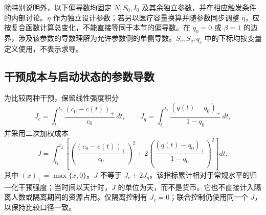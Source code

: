\documentclass[lang=cn,a4paper,newtx]{elegantpaper}
\numberwithin{equation}{section}
\theoremstyle{plain}
\begin{document}
除特别说明外，以下偏导数均固定 $N,S_0,I_0$ 及其余独立参数，并在相应触发条件的内部讨论。$\eta$ 作为独立设计参数；若另以医疗容量换算并随参数同步调整 $\eta$，应按复合函数计算总变化，不能直接等同于本节的偏导数。在 $q_0=0$ 或 $\beta=1$ 的边界，涉及该参数的导数理解为允许参数侧的单侧导数。$S_c,S_q,q_c$ 中的下标均按变量定义使用，不表示求导。

\subsection{干预成本与启动状态的参数导数}
为比较两种干预，保留线性强度积分
\begin{equation}
J_c=\int_{t_1}^{t_2}\frac{(c_0-c(t))_+}{c_0}\,dt,
\qquad
J_q=\int_{t_1}^{t_2}\frac{(q(t)-q_0)_+}{1-q_0}\,dt,
\label{eq:cost:linear}
\end{equation}
并采用二次加权成本
\begin{equation}
J=\int_{t_1}^{t_2}\left[
\left(\frac{(c_0-c(t))_+}{c_0}\right)^2
+2\left(\frac{(q(t)-q_0)_+}{1-q_0}\right)^2\right]dt,
\label{eq:cost:J}
\end{equation}
其中 $(x)_+=\max\{x,0\}$。$J$ 不等于 $J_c+2J_q$。该指标累计相对于常规水平的归一化干预强度；当时间以天计时，$J$ 的单位为天，而不是货币。它也不直接计入隔离人数或隔离期间的资源占用。仅隔离控制有 $J_c=0$；联合控制仍使用同一个 $J$，以保持比较口径一致。
\end{document}
